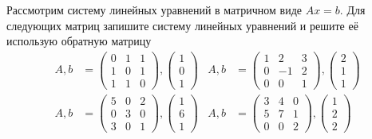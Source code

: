 \begin{exercise}
Рассмотрим систему линейных уравнений в матричном виде \(Ax=b\).
Для следующих матриц запишите систему линейных уравнений и решите её использую обратную матрицу
\begin{align*}
	A,b&=\begin{pmatrix}
		0 & 1 & 1 \\ 1 & 0 & 1 \\ 1 & 1 & 0
	\end{pmatrix}, \begin{pmatrix}
		1 \\ 0 \\ 1
	\end{pmatrix} & 
	A,b&=\begin{pmatrix}
		1 & 2 & 3 \\ 0 & -1 & 2 \\ 0 & 0 & 1
	\end{pmatrix}, \begin{pmatrix}
		2 \\ 1 \\ 1
	\end{pmatrix} \\
	A,b&=\begin{pmatrix}
		5 & 0 & 2 \\ 0 & 3 & 0 \\ 3 & 0 & 1
	\end{pmatrix}, \begin{pmatrix}
		1 \\ 6 \\ 1
	\end{pmatrix} & 
	A,b&=\begin{pmatrix}
		3 & 4 & 0 \\ 5 & 7 & 1 \\ 0 & 0 & 2
	\end{pmatrix}, \begin{pmatrix}
		1 \\ 2 \\ 2
	\end{pmatrix}
\end{align*}
\end{exercise}

